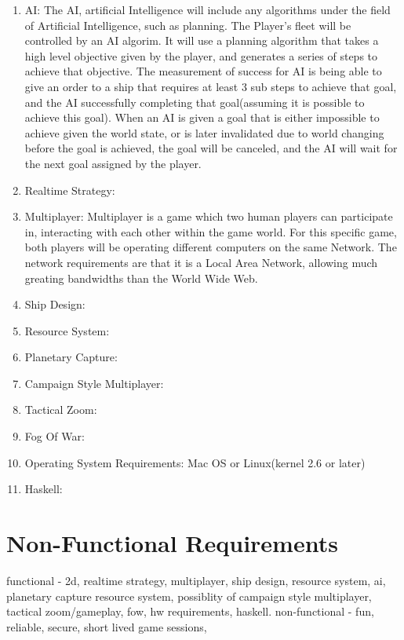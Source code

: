 \begin{enumerate}

\item AI:
The AI, artificial Intelligence will include any algorithms under the field of Artificial Intelligence, such as planning.
The Player's fleet will be controlled by an AI algorim. It will use a planning algorithm that takes a high level objective given by the player, and generates a series of steps to achieve that objective.
The measurement of success for AI is being able to give an order to a ship that requires at least 3 sub steps to achieve that goal, and the AI successfully completing that goal(assuming it is possible to achieve this goal).
When an AI is given a goal that is either impossible to achieve given the world state, or is later invalidated due to world changing before the goal is achieved, the goal will be canceled, and the AI will wait for the next goal assigned by the player.

\item Realtime Strategy:


\item Multiplayer:
Multiplayer is a game which two human players can participate in, interacting with each other within the game world.
For this specific game, both players will be operating different computers on the same Network.
The network requirements are that it is a Local Area Network, allowing much greating bandwidths than the World Wide Web.

\item Ship Design:


\item Resource System:

\item Planetary Capture:

\item Campaign Style Multiplayer:

\item Tactical Zoom:

\item Fog Of War:

\item Operating System Requirements:
Mac OS or Linux(kernel 2.6 or later) 

\item Haskell:

\end{enumerate}


\section{Non-Functional Requirements}




functional - 2d, realtime strategy, multiplayer, ship design, resource system, ai, planetary capture resource system, possiblity of campaign style multiplayer, tactical zoom/gameplay, fow, hw requirements, haskell.
non-functional - fun, reliable, secure, short lived game sessions, 
